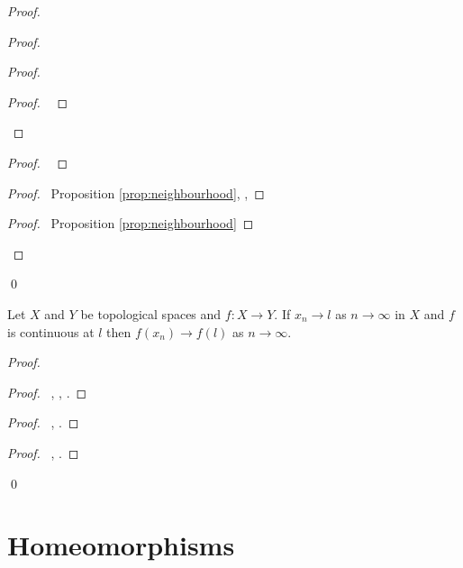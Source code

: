 \begin{proof}
\begin{proof}
\begin{proof}
      \qedstep
      \begin{proof}
        \pf\ 
      \end{proof}
    \end{proof}
    \begin{proof}
      \pf\ 
    \end{proof}
    \begin{proof}
      \pf\ Proposition \ref{prop:neighbourhood}, , 
    \end{proof}
    \qedstep
    \begin{proof}
      \pf\ Proposition \ref{prop:neighbourhood}
    \end{proof}
  \end{proof}
  \qed
\end{proof}

\begin{prop}
  \label{prop:continuous:converge}
  Let $X$ and $Y$ be topological spaces and $f : X \rightarrow Y$. If $x_n \rightarrow l$ as $n \rightarrow \infty$ in $X$ and $f$ is continuous at $l$ then $f(x_n) \rightarrow f(l)$ as $n \rightarrow \infty$.
\end{prop}

\begin{proof}
  \pf
  \begin{proof}
    \pf\ , , .
  \end{proof}
  \begin{proof}
    \pf\ , .
  \end{proof}
  \begin{proof}
    \pf\ , .
  \end{proof}
  \qed
\end{proof}

\section{Homeomorphisms}


